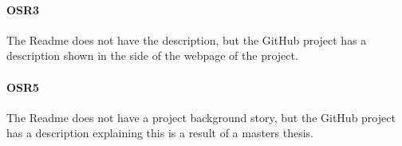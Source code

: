 \paragraph{OSR3} The Readme does not have the description, but the \gls{GitHub} project has a description shown in the side of the webpage of the project.

\paragraph{OSR5} The Readme does not have a project background story, but the \gls{GitHub} project has a description explaining this is a result of a masters thesis.


